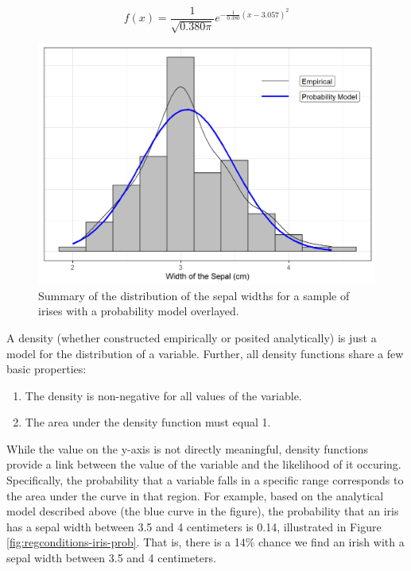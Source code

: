 \documentclass[
]{book}
\providecommand{\tightlist}{%
  \setlength{\itemsep}{0pt}\setlength{\parskip}{0pt}}
\theoremstyle{plain}
\theoremstyle{mydefn}
\theoremstyle{myexmpl}
\theoremstyle{remark}
\begin{document}
\[f(x) = \frac{1}{\sqrt{0.380\pi}} e^{-\frac{1}{0.380}(x - 3.057)^2}\]

\begin{figure}

{\centering \includegraphics[width=0.8\linewidth]{./Images/regconditions-iris-normal-1} 

}

\caption{Summary of the distribution of the sepal widths for a sample of irises with a probability model overlayed.}\label{fig:regconditions-iris-normal}
\end{figure}

A density (whether constructed empirically or posited analytically) is just a model for the distribution of a variable. Further, all density functions share a few basic properties:

\begin{enumerate}
\def\labelenumi{\arabic{enumi}.}
\tightlist
\item
  The density is non-negative for all values of the variable.
\item
  The area under the density function must equal 1.
\end{enumerate}

While the value on the y-axis is not directly meaningful, density functions provide a link between the value of the variable and the likelihood of it occuring. Specifically, the probability that a variable falls in a specific range corresponds to the area under the curve in that region. For example, based on the analytical model described above (the blue curve in the figure), the probability that an iris has a sepal width between 3.5 and 4 centimeters is 0.14, illustrated in Figure \ref{fig:regconditions-iris-prob}. That is, there is a 14\% chance we find an irish with a sepal width between 3.5 and 4 centimeters.
\end{document}
